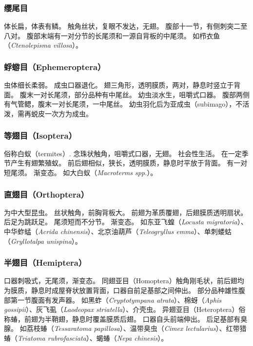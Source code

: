 \documentclass[11pt]{article}
\begin{document}
\subsubsection{缨尾目}
体长扁，体表有鳞。
触角丝状，复眼不发达，无翅。
腹部十一节，有侧刺突二至八对。
腹部末端有一对分节的长尾须和一源自背板的中尾须。
如栉衣鱼（\textit{Ctenolepisma villosa}）。

\subsubsection{蜉蝣目（Ephemeroptera）}
虫体细长柔弱。
成虫口器退化。
翅三角形，透明膜质，两对，静息时竖立于背面。
腹末一对长尾须，部分品种有中尾丝。
幼虫淡水生，咀嚼式口器。
腹部两侧有气管鳃，腹末一对长尾须，一中尾丝。
幼虫羽化后为亚成虫（subimago），不活泼，需再蜕皮一次方为成虫。

\subsubsection{等翅目（Isoptera）}
俗称白蚁（termites）.
念珠状触角，咀嚼式口器，无翅。
社会性生活。
在一定季节产生有翅繁殖蚁。
前后翅相似，狭长，透明膜质，静息时平放于背面。
有一对短尾须。
渐变态。
如大白蚁（\textit{Macroterms spp.}）。

\subsubsection{直翅目（Orthoptera）}
为中大型昆虫。
丝状触角，前胸背板大。
前翅为革质覆翅，后翅膜质透明扇状。
后足为跳跃足。
尾须短而不分节。
渐变态。
如东亚飞蝗（\textit{Locusta migratoria}）、中华蚱蜢（\textit{Acrida chinensis}）、北京油葫芦（\textit{Teleogryllus emma}）、单刺蝼蛄（\textit{Gryllotalpa unispina}）。

\subsubsection{半翅目（Hemiptera）}
口器刺吸式，无尾须，渐变态。
同翅亚目（Homoptera）触角刚毛状，前后翅均为膜质，静息时成屋脊状放置背面，口器自前足基部之间伸出。
部分品种雄性腹部第一节腹面有发声器。
如黑蚱（\textit{Cryptotympana atrata}）、棉蚜（\textit{Aphis gossipii}）、灰飞虱（\textit{Laodeopax striatella}）、介壳虫。
异翅亚目（Heteroptera）俗称蝽，前翅为半鞘翅，静息时覆盖膜质后翅。
口器自头前端伸出。
后足基部有臭腺。
如荔枝蝽（\textit{Tessaratoma papillosa}）、温带臭虫（\textit{Cimex lectularius}）、红带猎蝽（\textit{Triatoma rubrofasciata}）、蝎蝽（\textit{Nepa chinesis}）。
\end{document}
